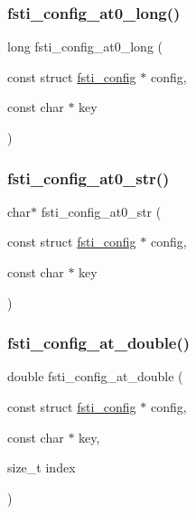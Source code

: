 \mbox{\label{fsti-config_8h_a9f3d5723f366dc5de1ed8c23c32db499}} 
\subsubsection{\texorpdfstring{fsti\+\_\+config\+\_\+at0\+\_\+long()}{fsti\_config\_at0\_long()}}
{\footnotesize\ttfamily long fsti\+\_\+config\+\_\+at0\+\_\+long (\begin{DoxyParamCaption}\item[{const struct \mbox{\hyperlink{structfsti__config}{fsti\+\_\+config}} $\ast$}]{config,  }\item[{const char $\ast$}]{key }\end{DoxyParamCaption})}

\mbox{\label{fsti-config_8h_a50a8eef9690263f45e229ce63cdefbfc}} 
\subsubsection{\texorpdfstring{fsti\+\_\+config\+\_\+at0\+\_\+str()}{fsti\_config\_at0\_str()}}
{\footnotesize\ttfamily char$\ast$ fsti\+\_\+config\+\_\+at0\+\_\+str (\begin{DoxyParamCaption}\item[{const struct \mbox{\hyperlink{structfsti__config}{fsti\+\_\+config}} $\ast$}]{config,  }\item[{const char $\ast$}]{key }\end{DoxyParamCaption})}

\mbox{\label{fsti-config_8h_a62f94d64fed8d92993151b3fcbfa6a3f}} 
\subsubsection{\texorpdfstring{fsti\+\_\+config\+\_\+at\+\_\+double()}{fsti\_config\_at\_double()}}
{\footnotesize\ttfamily double fsti\+\_\+config\+\_\+at\+\_\+double (\begin{DoxyParamCaption}\item[{const struct \mbox{\hyperlink{structfsti__config}{fsti\+\_\+config}} $\ast$}]{config,  }\item[{const char $\ast$}]{key,  }\item[{size\+\_\+t}]{index }\end{DoxyParamCaption})}

